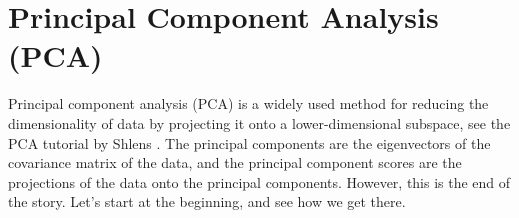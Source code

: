 \documentclass{article}[11pt]
\def\R{\mathbb{R}}
\def\D{\mathcal{D}}
\begin{document}
\section{Principal Component Analysis (PCA)}
Principal component analysis (PCA) is a widely used method for reducing the dimensionality of data by projecting it onto a lower-dimensional subspace, see the PCA tutorial by Shlens \citep{Shlens:2014}.
The principal components are the eigenvectors of the covariance matrix of the data, and the principal component scores are the projections of the data onto the principal components.
However, this is the end of the story. Let's start at the beginning, and see how we get there.

\end{document}
